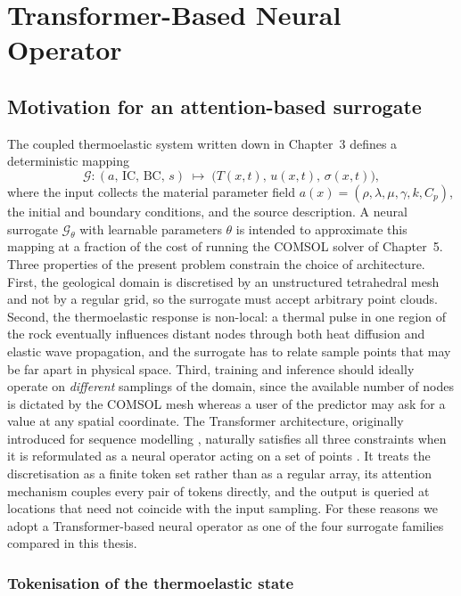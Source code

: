 \section{Transformer-Based Neural Operator}

\subsection{Motivation for an attention-based surrogate}

The coupled thermoelastic system written down in Chapter~3 defines a
deterministic mapping
\begin{equation}
\mathcal{G}: (a,\,\mathrm{IC},\,\mathrm{BC},\,s) \;\longmapsto\; \big(T(x,t),\,u(x,t),\,\sigma(x,t)\big),
\end{equation}
where the input collects the material parameter field
\(a(x) = (\rho,\lambda,\mu,\gamma,k,C_p)\), the initial and
boundary conditions, and the source description. A neural surrogate
\(\mathcal{G}_\theta\) with learnable parameters \(\theta\) is intended
to approximate this mapping at a fraction of the cost of running the
COMSOL solver of Chapter~5. Three properties of the present problem
constrain the choice of architecture. First, the geological domain is
discretised by an unstructured tetrahedral mesh and not by a regular
grid, so the surrogate must accept arbitrary point clouds. Second, the
thermoelastic response is non-local: a thermal pulse in one region of
the rock eventually influences distant nodes through both heat
diffusion and elastic wave propagation, and the surrogate has to relate
sample points that may be far apart in physical space. Third, training
and inference should ideally operate on \emph{different} samplings of
the domain, since the available number of nodes is dictated by the
COMSOL mesh whereas a user of the predictor may ask for a value at any
spatial coordinate. The Transformer architecture, originally introduced
for sequence modelling \cite{vaswani2017}, naturally satisfies all
three constraints when it is reformulated as a neural operator acting
on a set of points \cite{liNeuralOperator2023}. It treats the
discretisation as a finite token set rather than as a regular array,
its attention mechanism couples every pair of tokens directly, and the
output is queried at locations that need not coincide with the input
sampling. For these reasons we adopt a Transformer-based neural
operator as one of the four surrogate families compared in this
thesis.

\subsubsection{Tokenisation of the thermoelastic state}

